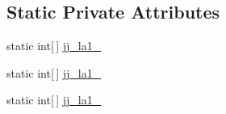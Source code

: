 \subsection*{Static Private Attributes}
\begin{DoxyCompactItemize}
\item 
static int\mbox{[}$\,$\mbox{]} \hyperlink{classde_1_1uulm_1_1ecs_1_1ai_1_1owlapi_1_1krssparser_1_1_k_r_s_s2_parser_a6cfc7c78c7b5ac12431774cf37135790}{jj\-\_\-la1\-\_}
\item 
static int\mbox{[}$\,$\mbox{]} \hyperlink{classde_1_1uulm_1_1ecs_1_1ai_1_1owlapi_1_1krssparser_1_1_k_r_s_s2_parser_a1159d17632fa904b4cd827f23c8132fa}{jj\-\_\-la1\-\_}
\item 
static int\mbox{[}$\,$\mbox{]} \hyperlink{classde_1_1uulm_1_1ecs_1_1ai_1_1owlapi_1_1krssparser_1_1_k_r_s_s2_parser_a4e0fc9862e697da3709175e671d289c1}{jj\-\_\-la1\-\_}
\end{DoxyCompactItemize}


